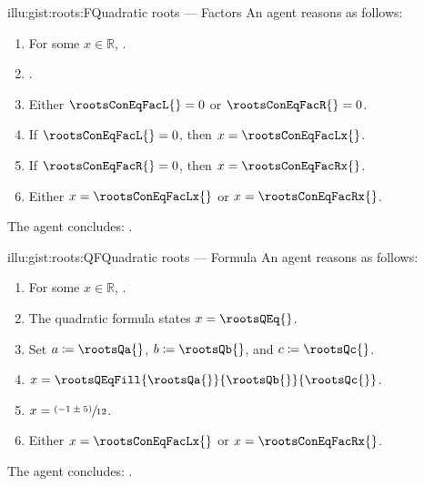 \documentclass[10pt]{article}
\begin{document}
\begin{note}
  \begin{minipage}{.5\linewidth}
    \begin{rscenariox}{illu:gist:roots:F}{Quadratic roots --- Factors}%
      An agent reasons as follows:
      \begin{enumerate}[label=\arabic*., ref=\arabic*]
      \item
        \label{illu:gist:roots:F:eq}
        For some \(x \in \mathbb{R}\), \rootsConEq{}.
      \item
        \label{illu:gist:roots:F:factor}
        \rootsConEqFac{}.
      \item
        \label{illu:gist:roots:F:zero}
        Either \(\rootsConEqFacL{} = 0\) or \(\rootsConEqFacR{} = 0\).
      \item
        \label{illu:gist:roots:F:case:a}
        If \(\rootsConEqFacL{} = 0\), then \(x = \rootsConEqFacLx{}\).
      \item
        \label{illu:gist:roots:F:case:b}
        If \(\rootsConEqFacR{} = 0\), then \(x = \rootsConEqFacRx{}\).
      \item
        \label{illu:gist:roots:F:factor:done}
        Either \(x = \rootsConEqFacLx{}\) or \(x = \rootsConEqFacRx{}\).
      \end{enumerate}
      The agent concludes:
      \rootsCon{}.
    \end{rscenariox}
  \end{minipage}
  \begin{minipage}{.5\linewidth}
    \begin{rscenariox}{illu:gist:roots:QF}{Quadratic roots --- Formula}%
      An agent reasons as follows:
      \begin{enumerate}[label=\arabic*., ref=\arabic*]
      \item
        \label{illu:gist:roots:QF:eq}
        For some \(x \in \mathbb{R}\), \rootsConEq{}.
      \item
        \label{illu:gist:roots:QF:qf}
        The quadratic formula states \(x = \rootsQEq{}\).
      \item
        \label{illu:gist:roots:QF:subs}
        Set \(a \coloneq \rootsQa{}\), \(b \coloneq \rootsQb{}\), and \(c \coloneq \rootsQc{}\).%
        \footnotemark
      \item
        \label{illu:gist:roots:QF:qf-subs}
        \(x = \rootsQEqFill{\rootsQa{}}{\rootsQb{}}{\rootsQc{}}\).
      \item
        \label{illu:gist:roots:QF:qf:1}
        \(x = \sfrac{(- 1 \pm 5)}{12}\).
      \item
        \label{illu:gist:roots:QF:qf:done}
        Either \(x = \rootsConEqFacLx{}\) or \(x = \rootsConEqFacRx{}\).
      \end{enumerate}
      The agent concludes:
      \rootsCon{}.
    \end{rscenariox}
  \end{minipage}


\end{note}
\end{document}
